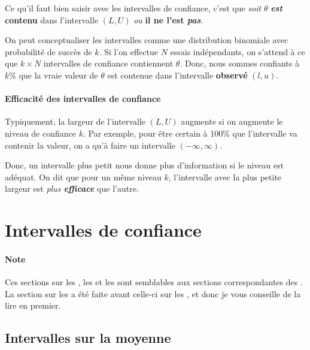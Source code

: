 \documentclass[french]{article}
\begin{document}
\begin{multicols*}{2}
\begin{rappel_enhanced}[Contexte]
Ce qu'il faut bien saisir avec les intervalles de confiance, c'est que \textit{soit} $\theta$ \textbf{\textit{est} contenu} dans l'intervalle $(L, U)$ \textit{ou} \textbf{il ne l'est \textit{pas}}.

\bigskip

On peut conceptualiser les intervalles comme une distribution binomiale avec probabilité de succès de $k$. Si l'on effectue $N$ essais indépendants, on s'attend à ce que $k \times N$ intervalles de confiance contiennent $\theta$. Donc, nous sommes confiants à $k\%$ que la vraie valeur de $\theta$ est contenue dans l'intervalle \textbf{observé} $(l, u)$.
\end{rappel_enhanced}


\paragraph{Efficacité des intervalles de confiance}
Typiquement, la largeur de l'intervalle $(L, U)$ augmente si on augmente le niveau de confiance $k$. Par exemple, pour être certain à 100\% que l'intervalle va contenir la valeur, on a qu'à faire un intervalle $(-\infty, \infty)$.

\bigskip

Donc, un intervalle plus petit nous donne plus d'information si le niveau est adéquat. On dit que pour un même niveau $k$, l'intervalle avec la plus petite largeur est \textit{plus \textbf{efficace}} que l'autre.


\columnbreak
\section{Intervalles de confiance}\label{sec:intConf}
\paragraph{Note}	Ces sections sur les \textit{\underline{}}, les \textit{\underline{}} et les  \textit{\underline{}} sont semblables aux sections correspondantes des \textit{\underline{}}. La section sur les \textit{\underline{}} a été faite avant celle-ci sur les \textit{\underline{}}, et donc je vous conseille de la lire en premier.

\subsection{Intervalles sur la moyenne}\label{subsec:meanIC}

\end{multicols*}
\end{document}
